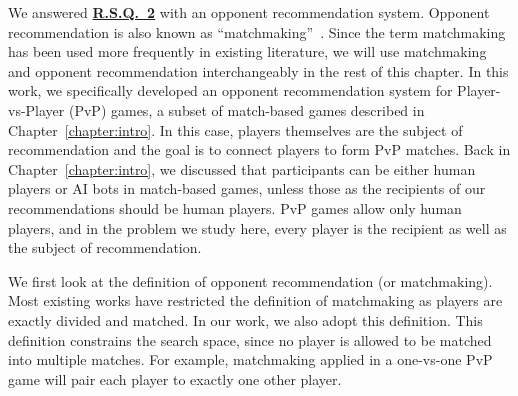 
We answered \hyperref[rq2]{\textbf{R.S.Q.~2}} with an opponent recommendation system. Opponent recommendation is also known as ``matchmaking''~\citep{medler2011using}. Since the term matchmaking has been used more frequently in existing literature, we will use matchmaking and opponent recommendation interchangeably in the rest of this chapter. In this work, we specifically developed an opponent recommendation system for Player-vs-Player (PvP) games, a subset of match-based games described in Chapter~\ref{chapter:intro}. In this case, players themselves are the subject of recommendation and the goal is to connect players to form  PvP matches. Back in Chapter~\ref{chapter:intro}, we discussed that participants can be either human players or AI bots in match-based games, unless those as the recipients of our recommendations should be human players. PvP games allow only human players, and in the  problem we study here, every player is the recipient as well as the subject of recommendation. 

We first look at the definition of opponent recommendation (or matchmaking). Most existing works have restricted the definition of matchmaking as players are exactly divided and matched. In our work, we also adopt this definition. This definition constrains the search space, since no player is allowed to be matched into multiple matches. For example, matchmaking applied in a one-vs-one PvP game will pair each player to exactly one other player. 


